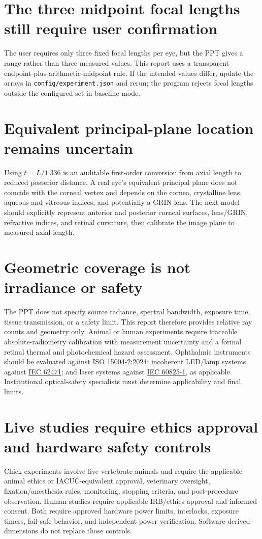\documentclass[11pt,openany]{report}
\newcommand{\sourcefile}[1]{\nolinkurl{#1}}
\begin{document}
\section{The three midpoint focal lengths still require user confirmation}
The user requires only three fixed focal lengths per eye, but the PPT gives a range rather than three measured values. This report uses a transparent endpoint-plus-arithmetic-midpoint rule. If the intended values differ, update the arrays in \sourcefile{config/experiment.json} and rerun; the program rejects focal lengths outside the configured set in baseline mode.

\section{Equivalent principal-plane location remains uncertain}
Using $t=L/1.336$ is an auditable first-order conversion from axial length to reduced posterior distance. A real eye's equivalent principal plane does not coincide with the corneal vertex and depends on the cornea, crystalline lens, aqueous and vitreous indices, and potentially a GRIN lens. The next model should explicitly represent anterior and posterior corneal surfaces, lens/GRIN, refractive indices, and retinal curvature, then calibrate the image plane to measured axial length.

\section{Geometric coverage is not irradiance or safety}
The PPT does not specify source radiance, spectral bandwidth, exposure time, tissue transmission, or a safety limit. This report therefore provides relative ray counts and geometry only. Animal or human experiments require traceable absolute-radiometry calibration with measurement uncertainty and a formal retinal thermal and photochemical hazard assessment. Ophthalmic instruments should be evaluated against \href{https://www.iso.org/standard/79919.html}{ISO 15004-2:2024}; incoherent LED/lamp systems against \href{https://webstore.iec.ch/en/publication/7076}{IEC 62471}; and laser systems against \href{https://webstore.iec.ch/en/publication/3587}{IEC 60825-1}, as applicable. Institutional optical-safety specialists must determine applicability and final limits.

\section{Live studies require ethics approval and hardware safety controls}
Chick experiments involve live vertebrate animals and require the applicable animal ethics or IACUC-equivalent approval, veterinary oversight, fixation/anesthesia rules, monitoring, stopping criteria, and post-procedure observation. Human studies require applicable IRB/ethics approval and informed consent. Both require approved hardware power limits, interlocks, exposure timers, fail-safe behavior, and independent power verification. Software-derived dimensions do not replace those controls.
\end{document}
